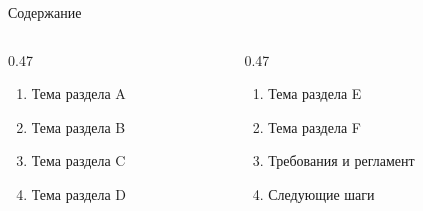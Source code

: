 \begin{frame}{Содержание}
  \vspace{0.4em}
  \begin{columns}[T]
    \begin{column}{0.47\textwidth}
      \begin{enumerate}\setlength\itemsep{0.55em}
        \item Тема раздела A
        \item Тема раздела B
        \item Тема раздела C
        \item Тема раздела D
      \end{enumerate}
    \end{column}
    \begin{column}{0.47\textwidth}
      \begin{enumerate}\setlength\itemsep{0.55em}\setcounter{enumi}{4}
        \item Тема раздела E
        \item Тема раздела F
        \item Требования и регламент
        \item Следующие шаги
      \end{enumerate}
    \end{column}
  \end{columns}
\end{frame}
